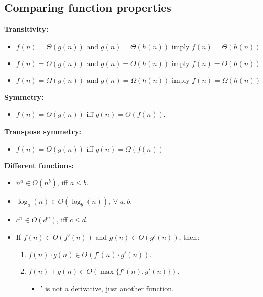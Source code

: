 \subsection{Comparing function properties}
    \begin{definition}
        
        \textbf{Transitivity:}
        \begin{itemize}
            \item $f(n) = \Theta(g(n)) \text{ and } g(n)=\Theta(h(n)) \text{ imply } f(n) = \Theta(h(n))$
            \item $f(n) = O(g(n)) \text{ and } g(n)=O(h(n)) \text{ imply } f(n) = O(h(n))$
            \item $f(n) = \Omega(g(n)) \text{ and } g(n)=\Omega(h(n)) \text{ imply } f(n) = \Omega(h(n))$
        \end{itemize}
        \vspace{1em}

        \textbf{Symmetry:}
        \begin{itemize}
            \item $f(n) = \Theta(g(n)) \text{ iff } g(n) = \Theta(f(n))$.
        \end{itemize}
        \vspace{1em}

        \textbf{Transpose symmetry:}
        \begin{itemize}
            \item $f(n) = O(g(n)) \text{ iff } g(n) = \Omega(f(n))$
        \end{itemize}
        \vspace{1em}

        \textbf{Different functions:}
        \begin{itemize}
            \item \( n^a \in O(n^b) \), iff \( a \leq b \).
            \item \( \log_a(n) \in O(\log_b(n)) \), $\forall$ \( a, b \).
            \item \( c^n \in O(d^n) \), iff \( c \leq d \).
            \item If \( f(n) \in O(f'(n)) \) and \( g(n) \in O(g'(n)) \), then:
            \begin{enumerate}
                \item \( f(n) \cdot g(n) \in O(f'(n) \cdot g'(n)) \).
                \item \( f(n) + g(n) \in O(\max\{f'(n), g'(n)\}) \).
                \begin{itemize}
                    \item ' is not a derivative, just another function. 
                \end{itemize}
            \end{enumerate}
        \end{itemize}
        
    \end{definition}

